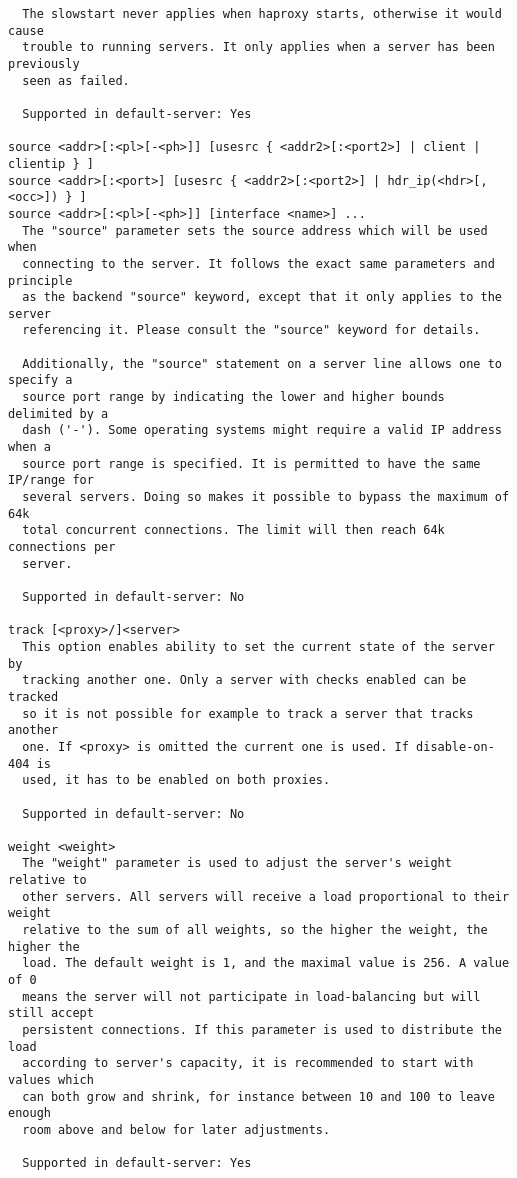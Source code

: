 \begin{verbatim}
  The slowstart never applies when haproxy starts, otherwise it would cause
  trouble to running servers. It only applies when a server has been previously
  seen as failed.

  Supported in default-server: Yes

source <addr>[:<pl>[-<ph>]] [usesrc { <addr2>[:<port2>] | client | clientip } ]
source <addr>[:<port>] [usesrc { <addr2>[:<port2>] | hdr_ip(<hdr>[,<occ>]) } ]
source <addr>[:<pl>[-<ph>]] [interface <name>] ...
  The "source" parameter sets the source address which will be used when
  connecting to the server. It follows the exact same parameters and principle
  as the backend "source" keyword, except that it only applies to the server
  referencing it. Please consult the "source" keyword for details.

  Additionally, the "source" statement on a server line allows one to specify a
  source port range by indicating the lower and higher bounds delimited by a
  dash ('-'). Some operating systems might require a valid IP address when a
  source port range is specified. It is permitted to have the same IP/range for
  several servers. Doing so makes it possible to bypass the maximum of 64k
  total concurrent connections. The limit will then reach 64k connections per
  server.

  Supported in default-server: No

track [<proxy>/]<server>
  This option enables ability to set the current state of the server by
  tracking another one. Only a server with checks enabled can be tracked
  so it is not possible for example to track a server that tracks another
  one. If <proxy> is omitted the current one is used. If disable-on-404 is
  used, it has to be enabled on both proxies.

  Supported in default-server: No

weight <weight>
  The "weight" parameter is used to adjust the server's weight relative to
  other servers. All servers will receive a load proportional to their weight
  relative to the sum of all weights, so the higher the weight, the higher the
  load. The default weight is 1, and the maximal value is 256. A value of 0
  means the server will not participate in load-balancing but will still accept
  persistent connections. If this parameter is used to distribute the load
  according to server's capacity, it is recommended to start with values which
  can both grow and shrink, for instance between 10 and 100 to leave enough
  room above and below for later adjustments.

  Supported in default-server: Yes


\end{verbatim}
